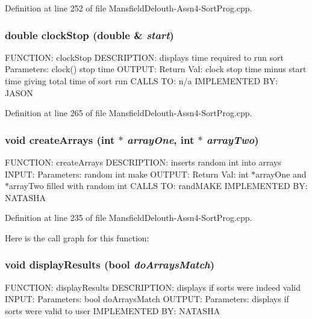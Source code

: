 Definition at line 252 of file MansfieldDelouth-\/Assn4-\/SortProg.cpp.

\hypertarget{_mansfield_delouth-_assn4-_sort_prog_8cpp_aa5a4dbee524f1aa5d109bcdeeda1b9f6}{
\subsubsection[{clockStop}]{\setlength{\rightskip}{0pt plus 5cm}double clockStop (double \& {\em start})}}
\label{_mansfield_delouth-_assn4-_sort_prog_8cpp_aa5a4dbee524f1aa5d109bcdeeda1b9f6}
FUNCTION: clockStop DESCRIPTION: displays time required to run sort Parameters: clock() stop time OUTPUT: Return Val: clock stop time minus start time giving total time of sort run CALLS TO: n/a IMPLEMENTED BY: JASON 

Definition at line 265 of file MansfieldDelouth-\/Assn4-\/SortProg.cpp.

\hypertarget{_mansfield_delouth-_assn4-_sort_prog_8cpp_af209aad9d447548ca062515ab1acbe3c}{
\subsubsection[{createArrays}]{\setlength{\rightskip}{0pt plus 5cm}void createArrays (int $\ast$ {\em arrayOne}, \/  int $\ast$ {\em arrayTwo})}}
\label{_mansfield_delouth-_assn4-_sort_prog_8cpp_af209aad9d447548ca062515ab1acbe3c}
FUNCTION: createArrays DESCRIPTION: inserts random int into arrays INPUT: Parameters: random int make OUTPUT: Return Val: int $\ast$arrayOne and $\ast$arrayTwo filled with random int CALLS TO: randMAKE IMPLEMENTED BY: NATASHA 

Definition at line 235 of file MansfieldDelouth-\/Assn4-\/SortProg.cpp.



Here is the call graph for this function:

\hypertarget{_mansfield_delouth-_assn4-_sort_prog_8cpp_a6832ddb090d7bf6c3b962acac96e3951}{
\subsubsection[{displayResults}]{\setlength{\rightskip}{0pt plus 5cm}void displayResults (bool {\em doArraysMatch})}}
\label{_mansfield_delouth-_assn4-_sort_prog_8cpp_a6832ddb090d7bf6c3b962acac96e3951}
FUNCTION: displayResults DESCRIPTION: displays if sorts were indeed valid INPUT: Parameters: bool doArraysMatch OUTPUT: Parameters: displays if sorts were valid to user IMPLEMENTED BY: NATASHA 

